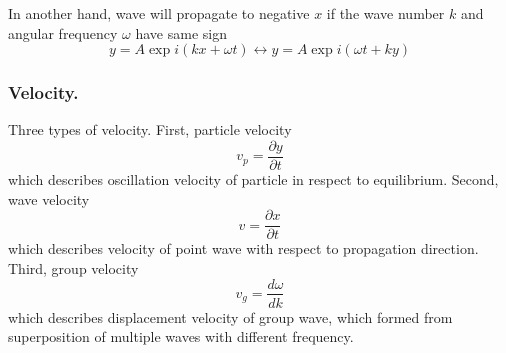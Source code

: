 \documentclass[../../../main.tex]{subfiles}
\begin{document}
In another hand, wave will propagate to negative $x$ if the wave number $k$ and angular frequency $\omega$ have same sign
\begin{equation*}
    y=A\exp i (kx+\omega t)\longleftrightarrow y=A\exp i (\omega t+ky)
\end{equation*}

\subsubsection{Velocity.} Three types of velocity. First, particle velocity
\begin{equation*}
    v_p=\frac{\partial y}{\partial t}
\end{equation*}
which describes oscillation velocity of particle in respect to equilibrium. Second, wave velocity
\begin{equation*}
    v=\frac{\partial x}{\partial t}
\end{equation*}
which describes velocity of point wave with respect to propagation direction. Third, group velocity
\begin{equation*}
    v_g=\frac{d\omega}{d k}
\end{equation*}
which describes displacement velocity of group wave, which formed from superposition of multiple waves with different frequency. 
\end{document}
